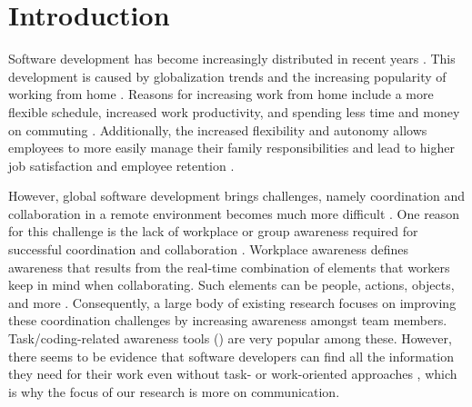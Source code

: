 \chapter{Introduction}
\label{chapter:introduction}
Software development has become increasingly distributed in recent years \autocite{herbsleb2001global}. This development is caused by globalization trends \autocite{herbsleb2007global} and the increasing popularity of working from home \autocite{ecoWorkingFromHome2021}. Reasons for increasing work from home include a more flexible schedule, increased work productivity, and spending less time and money on commuting \autocite{flores2019understanding, mulki2009set}. Additionally, the increased flexibility and autonomy allows employees to more easily manage their family responsibilities and lead to higher job satisfaction and employee retention \autocite{mulki2009set, gajendran2007good, madsen2011benefits}.

However, global software development brings challenges, namely coordination and collaboration in a remote environment becomes much more difficult \autocite{herbsleb2007global}. One reason for this challenge is the lack of workplace or group awareness required for successful coordination and collaboration \autocite{herbsleb2007global, gutwin2004group}. Workplace awareness defines awareness that results from the real-time combination of elements that workers keep in mind when collaborating. Such elements can be people, actions, objects, and more \autocite{gutwin1995support}. Consequently, a large body of existing research focuses on improving these coordination challenges by increasing awareness amongst team members. Task/coding-related awareness tools (\autocite{biehl2007fastdash, jakobsen2009wipdash}) are very popular among these. However, there seems to be evidence that software developers can find all the information they need for their work even without task- or work-oriented approaches \autocite{gutwin2004group}, which is why the focus of our research is more on communication.

